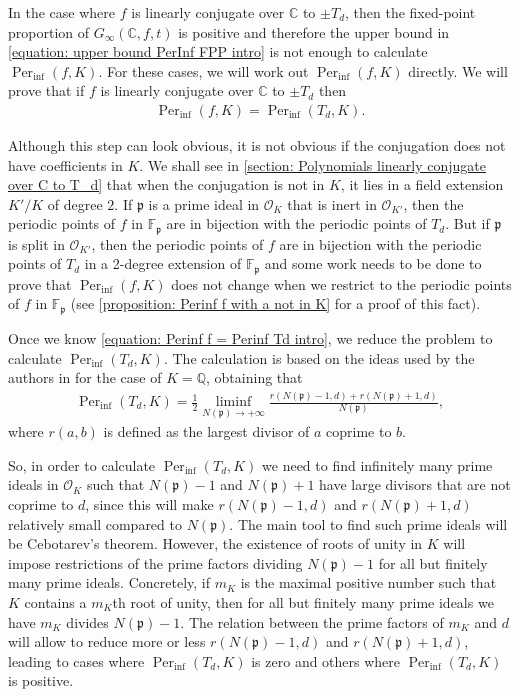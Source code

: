 \documentclass{amsart}
\def\QQ{\mathbb Q}
\def\OK{\mathcal{O}_K}
\def\FF{\mathbb F}
\def\CC{\mathbb C}
\DeclareMathOperator{\Per}{Per}
\theoremstyle{definition}
\begin{document}
In the case where $f$ is linearly conjugate over $\CC$ to $\pm T_d$, then the fixed-point proportion of $G_\infty(\CC,f,t)$ is positive and therefore the upper bound in \cref{equation: upper bound PerInf FPP intro} is not enough to calculate $\Per_{\inf}(f,K)$. For these cases, we will work out $\Per_{\inf}(f,K)$ directly. We will prove that if $f$ is linearly conjugate over $\CC$ to $\pm T_d$ then
\begin{align}
\Per_{\inf}(f,K) = \Per_{\inf}(T_d,K).
\label{equation: Perinf f = Perinf Td intro}
\end{align}

Although this step can look obvious, it is not obvious if the conjugation does not have coefficients in $K$. We shall see in \cref{section: Polynomials linearly conjugate over C to T_d} that when the conjugation is not in $K$, it lies in a field extension $K'/K$ of degree $2$. If $\mathfrak{p}$ is a prime ideal in $\OK$ that is inert in $\mathcal{O}_{K'}$, then the periodic points of $f$ in $\FF_\mathfrak{p}$ are in bijection with the periodic points of $T_d$. But if $\mathfrak{p}$ is split in $\mathcal{O}_{K'}$, then the periodic points of $f$ are in bijection with the periodic points of $T_d$ in a 2-degree extension of $\FF_\mathfrak{p}$ and some work needs to be done to prove that $\Per_{\inf}(f,K)$ does not change when we restrict to the periodic points of $f$ in $\FF_\mathfrak{p}$ (see \cref{proposition: Perinf f with a not in K} for a proof of this fact).

Once we know \cref{equation: Perinf f = Perinf Td intro}, we reduce the problem to calculate $\Per_{\inf}(T_d,K)$. The calculation is based on the ideas used by the authors in \cite[Example 7.2]{Juul2014} for the case of $K = \QQ$, obtaining that
\begin{align*}
\Per_{\inf}(T_d,K) = \frac{1}{2} \liminf_{N(\mathfrak{p}) \rightarrow +\infty} \frac{r(N(\mathfrak{p})-1,d) + r(N(\mathfrak{p})+1,d)}{N(\mathfrak{p})},
\end{align*}
where $r(a,b)$ is defined as the largest divisor of $a$ coprime to $b$.  

So, in order to calculate $\Per_{\inf}(T_d,K)$ we need to find infinitely many prime ideals in $\OK$ such that $N(\mathfrak{p})-1$ and $N(\mathfrak{p})+1$ have large divisors that are not coprime to $d$, since this will make 
$r(N(\mathfrak{p})-1,d)$ and $r(N(\mathfrak{p})+1,d)$ relatively small compared to $N(\mathfrak{p})$. The main tool to find such prime ideals will be Cebotarev's theorem. However, the existence of roots of unity in $K$ will impose restrictions of the prime factors dividing $N(\mathfrak{p})-1$ for all but finitely many prime ideals. Concretely, if $m_K$ is the maximal positive number such that $K$ contains a $m_K$th root of unity, then for all but finitely many prime ideals we have $m_K$ divides $N(\mathfrak{p})-1$. The relation between the prime factors of $m_K$ and $d$ will allow to reduce more or less $r(N(\mathfrak{p})-1,d)$ and $r(N(\mathfrak{p})+1,d)$, leading to cases where $\Per_{\inf}(T_d,K)$ is zero and others where $\Per_{\inf}(T_d,K)$ is positive. 
\end{document}
